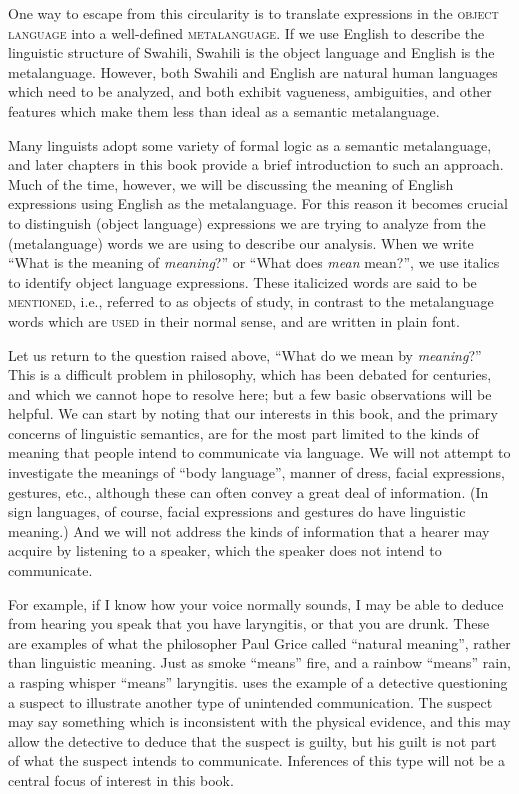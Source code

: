 One way to escape from this circularity is to translate expressions in the \textsc{object language} into a well-defined \textsc{metalanguage}. If we use English to describe the linguistic structure of  {Swahili},  {Swahili} is the object language and English is the metalanguage. However, both  {Swahili} and English are natural human languages which need to be analyzed, and both exhibit vagueness, ambiguities, and other features which make them less than ideal as a semantic metalanguage.


\newpage 
Many linguists adopt some variety of formal logic as a semantic metalanguage, and later chapters in this book provide a brief introduction to such an approach. Much of the time, however, we will be discussing the meaning of English expressions using English as the metalanguage. For this reason it becomes crucial to distinguish (object language) expressions we are trying to analyze from the (metalanguage) words we are using to describe our analysis. When we write “What is the meaning of \textit{meaning}?” or “What does \textit{mean} mean?”, we use italics to identify object language expressions. These italicized words are said to be \textsc{mentioned}, i.e., referred to as objects of study, in contrast to the metalanguage words which are \textsc{used} in their normal sense, and are written in plain font.



Let us return to the question raised above, “What do we mean by \textit{meaning}?” This is a difficult problem in philosophy, which has been debated for centuries, and which we cannot hope to resolve here; but a few basic observations will be helpful. We can start by noting that our interests in this book, and the primary concerns of linguistic semantics, are for the most part limited to the kinds of meaning that people intend to communicate via language. We will not attempt to investigate the meanings of “body language”, manner of dress, facial expressions, gestures, etc., although these can often convey a great deal of information. (In sign languages, of course, facial expressions and gestures do have linguistic meaning.) And we will not address the kinds of information that a hearer may acquire by listening to a speaker, which the speaker does not intend to communicate.



For example, if I know how your voice normally sounds, I may be able to deduce from hearing you speak that you have laryngitis, or that you are drunk. These are examples of what the philosopher Paul Grice called “natural meaning”, rather than linguistic meaning. Just as smoke “means” fire, and a rainbow “means” rain, a rasping whisper “means” laryngitis. \citet[15]{Levinson1983} uses the example of a detective questioning a suspect to illustrate another type of unintended communication. The suspect may say something which is inconsistent with the physical evidence, and this may allow the detective to deduce that the suspect is guilty, but his guilt is not part of what the suspect intends to communicate. Inferences of this type will not be a central focus of interest in this book.




